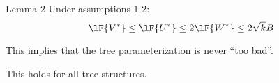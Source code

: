 \begin{frame}{}

\begin{block}{Lemma 2}
Under assumptions 1-2:
\begin{equation}
\lF{V^*} \le \lF{U^*} \le 2\lF{W^*} \le 2\sqrt{k}B
\end{equation}
\end{block}

This implies that the tree parameterization is never ``too bad''.

This holds for all tree structures.

\end{frame}



